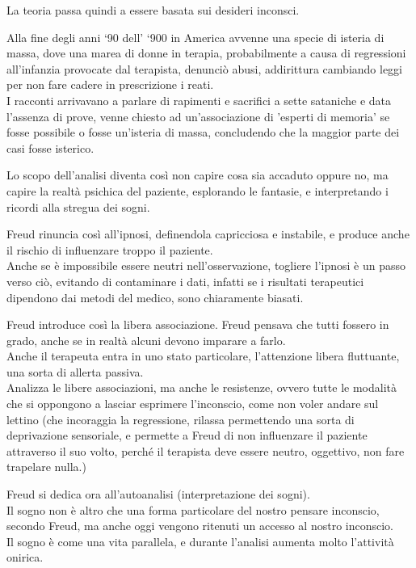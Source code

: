 \documentclass[
]{article}
\begin{document}
La teoria passa quindi a essere basata sui desideri inconsci.

Alla fine degli anni `90 dell' `900 in America avvenne una specie di
isteria di massa, dove una marea di donne in terapia, probabilmente a
causa di regressioni all'infanzia provocate dal terapista, denunciò
abusi, addirittura cambiando leggi per non fare cadere in prescrizione i
reati.\\
I racconti arrivavano a parlare di rapimenti e sacrifici a sette
sataniche e data l'assenza di prove, venne chiesto ad un'associazione di
'esperti di memoria' se fosse possibile o fosse un'isteria di massa,
concludendo che la maggior parte dei casi fosse isterico.

Lo scopo dell'analisi diventa così non capire cosa sia accaduto oppure
no, ma capire la realtà psichica del paziente, esplorando le fantasie, e
interpretando i ricordi alla stregua dei sogni.

Freud rinuncia così all'ipnosi, definendola capricciosa e instabile, e
produce anche il rischio di influenzare troppo il paziente.\\
Anche se è impossibile essere neutri nell'osservazione, togliere
l'ipnosi è un passo verso ciò, evitando di contaminare i dati, infatti
se i risultati terapeutici dipendono dai metodi del medico, sono
chiaramente biasati.

Freud introduce così la libera associazione. Freud pensava che tutti
fossero in grado, anche se in realtà alcuni devono imparare a farlo.\\
Anche il terapeuta entra in uno stato particolare, l'attenzione libera
fluttuante, una sorta di allerta passiva.\\
Analizza le libere associazioni, ma anche le resistenze, ovvero tutte le
modalità che si oppongono a lasciar esprimere l'inconscio, come non
voler andare sul lettino (che incoraggia la regressione, rilassa
permettendo una sorta di deprivazione sensoriale, e permette a Freud di
non influenzare il paziente attraverso il suo volto, perché il terapista
deve essere neutro, oggettivo, non fare trapelare nulla.)

Freud si dedica ora all'autoanalisi (interpretazione dei sogni).\\
Il sogno non è altro che una forma particolare del nostro pensare
inconscio, secondo Freud, ma anche oggi vengono ritenuti un accesso al
nostro inconscio.\\
Il sogno è come una vita parallela, e durante l'analisi aumenta molto
l'attività onirica.
\end{document}

